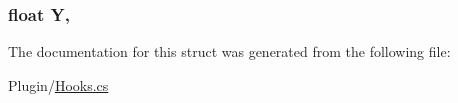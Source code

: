 \subsubsection[{Y}]{\setlength{\rightskip}{0pt plus 5cm}float Y\hspace{0.3cm}{\ttfamily [get]}, {\ttfamily [set]}}\label{structOTA_1_1Plugin_1_1HookArgs_1_1StateUpdateReceived_ac915220fb659eb2c5958a1ccd81b80d4}


The documentation for this struct was generated from the following file\+:\begin{DoxyCompactItemize}
\item 
Plugin/\hyperlink{Hooks_8cs}{Hooks.\+cs}\end{DoxyCompactItemize}
